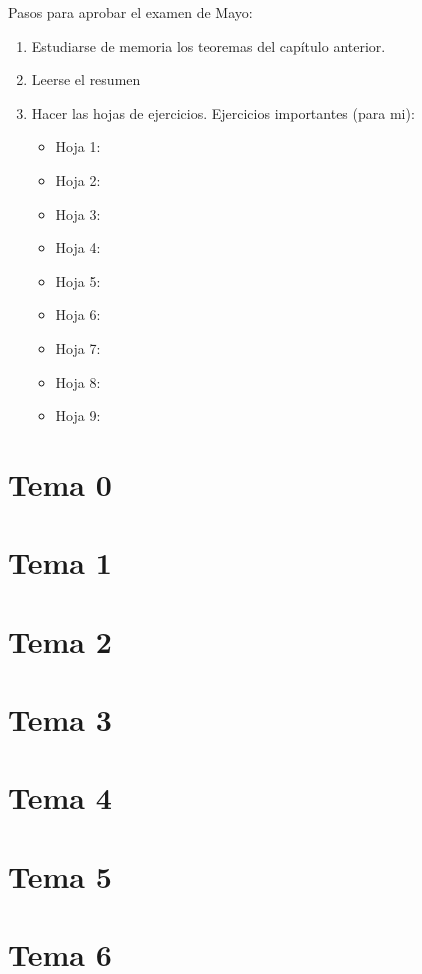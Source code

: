 \documentclass{apuntes}
\begin{document}
Pasos para aprobar el examen de Mayo:
\begin{enumerate}
\item Estudiarse de memoria los teoremas del capítulo anterior.
\item Leerse el resumen
\item Hacer las hojas de ejercicios. Ejercicios importantes (para mi):
\begin{itemize}
\item Hoja 1:
\item Hoja 2:
\item Hoja 3:
\item Hoja 4:
\item Hoja 5:
\item Hoja 6:
\item Hoja 7:
\item Hoja 8:
\item Hoja 9:
\end{itemize}
\end{enumerate}

\section{Tema 0}
\section{Tema 1}
\section{Tema 2}
\section{Tema 3}
\section{Tema 4}
\section{Tema 5}
\section{Tema 6}

\end{document}

